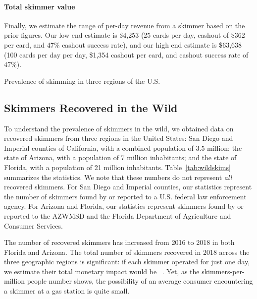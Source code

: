 \paragraph{Total skimmer value}

Finally, we estimate the range of per-day revenue from a skimmer based on the
prior figures. Our low end estimate is \$4,253 (25 cards per day, cashout of
\$362 per card, and 47\% cashout success rate), and our high end estimate is
\$63,638 (100 cards per day per day, \$1,354 cashout per card, and cashout success rate of
47\%).

\begin{table}
\centering
\captionsetup{justification=centering}
\caption{Prevalence of skimming in three regions of the U.S.}


\label{tab:wildskims}
\end{table}

\subsection{Skimmers Recovered in the Wild}
\label{sec:skimmersinwild}
To understand the prevalence of skimmers in the wild, we obtained data on recovered skimmers from three regions in the United States: San Diego and Imperial counties of California, with a combined population of 3.5 million; the state of Arizona, with a population of 7 million inhabitants; and the state of Florida, with a population of 21 million inhabitants. Table~\ref{tab:wildskims} summarizes the statistics. We note that these numbers do not represent \emph{all} recovered skimmers. For San Diego and Imperial counties, our statistics represent the number of skimmers found by or reported to a U.S. federal law enforcement agency. For Arizona and Florida, our statistics represent skimmers found by or reported to the AZWMSD and the Florida Department of Agriculture and Consumer Services.

The number of recovered skimmers has increased from 2016 to 2018 in both Florida and Arizona. The total number of skimmers recovered in 2018 across the three geographic regions is significant: if each skimmer operated for just one day, we estimate their total monetary impact would be ~\skimmerfraudXVIIIUSA. Yet, as the skimmers-per-million people number shows, the possibility of an average consumer encountering a skimmer at a gas station is quite small.
